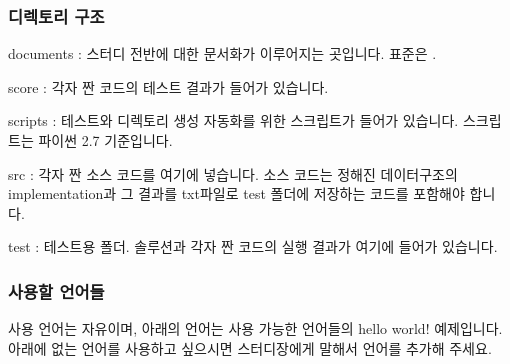 \subsubsection{디렉토리 구조}

\begin{compactitem}
\item documents : 스터디 전반에 대한 문서화가 이루어지는 곳입니다. 표준은 . 
\item score : 각자 짠 코드의 테스트 결과가 들어가 있습니다. 
\item scripts : 테스트와 디렉토리 생성 자동화를 위한 스크립트가 들어가 있습니다. 스크립트는 파이썬 2.7 기준입니다. 
\item src : 각자 짠 소스 코드를 여기에 넣습니다. 소스 코드는 정해진 데이터구조의 implementation과 그 결과를 txt파일로 test 폴더에 저장하는 코드를 포함해야 합니다. 
\item test : 테스트용 폴더. 솔루션과 각자 짠 코드의 실행 결과가 여기에 들어가 있습니다. 
\end{compactitem}


\subsubsection{사용할 언어들}

사용 언어는 자유이며, 아래의 언어는 사용 가능한 언어들의 hello world! 예제입니다. 아래에 없는 언어를 사용하고 싶으시면 스터디장에게 말해서 언어를 추가해 주세요. 

